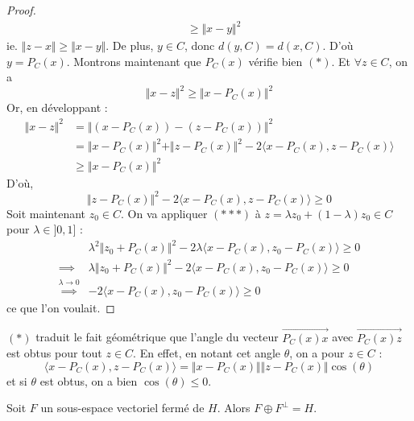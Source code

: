 \begin{proof}
\begin{align*}
			&\geq \Vert x - y \Vert^2
		\end{align*}
		ie. $\Vert z - x \Vert \geq \Vert x - y \Vert$. De plus, $y \in C$, donc $d(y, C) = d(x, C)$. D'où $y = P_C(x)$.
		\newpar
		Montrons maintenant que $P_C(x)$ vérifie bien $(*)$. Et $\forall z \in C$, on a
		\[ \Vert x - z \Vert^2 \geq \Vert x - P_C(x) \Vert^2 \]
		Or, en développant :
		\begin{align*}
			\Vert x - z \Vert^2 &= \Vert (x - P_C(x)) - (z - P_C(x)) \Vert^2 \\
			&= \Vert x - P_C(x) \Vert^2 + \Vert z - P_C(x) \Vert^2 - 2 \langle x - P_C(x), z - P_C(x) \rangle \\
			&\geq \Vert x - P_C(x) \Vert^2
		\end{align*}
		D'où,
		\[ \Vert z - P_C(x) \Vert^2 - 2 \langle x - P_C(x), z - P_C(x) \rangle \geq 0 \tag{$***$} \]
		Soit maintenant $z_0 \in C$. On va appliquer $(***)$ à $z = \lambda z_0 + (1 - \lambda) z_0 \in C$ pour $\lambda \in ]0, 1]$ :
		\begin{align*}
			& \lambda^2 \Vert z_0 + P_C(x) \Vert^2 -2 \lambda \langle x - P_C(x), z_0 - P_C(x) \rangle \geq 0 \\
			\implies& \lambda \Vert z_0 + P_C(x) \Vert^2 -2 \langle x - P_C(x), z_0 - P_C(x) \rangle \geq 0 \\
			\overset{\lambda \longrightarrow 0}{\implies}& -2 \langle x - P_C(x), z_0 - P_C(x) \rangle \geq 0
		\end{align*}
		ce que l'on voulait.
	\end{proof}

	\begin{remark}
		$(*)$ traduit le fait géométrique que l'angle du vecteur $\overrightarrow{P_C(x)x}$ avec $\overrightarrow{P_C(x)z}$ est obtus pour tout $z \in C$. En effet, en notant cet angle $\theta$, on a pour $z \in C$ :
		\[ \langle x - P_C(x), z - P_C(x) \rangle = \Vert x - P_C(x) \Vert \Vert z - P_C(x) \Vert \cos (\theta) \]
		et si $\theta$ est obtus, on a bien $\cos (\theta) \leq 0$.
	\end{remark}

	\begin{corollary}
		Soit $F$ un sous-espace vectoriel fermé de $H$. Alors $F \oplus F^\perp = H$.
	\end{corollary}

